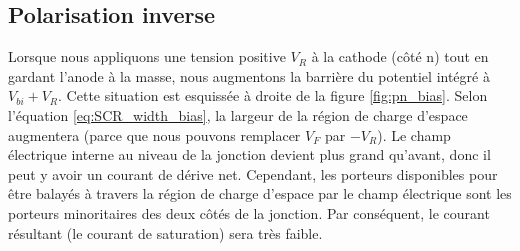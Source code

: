 \subsection{Polarisation inverse}
Lorsque nous appliquons une tension positive $V_R$ à la cathode (côté n) tout en gardant l'anode à la masse, nous augmentons la barrière du potentiel intégré à $V_{bi}+V_R$. Cette situation est esquissée à droite de la figure \ref{fig:pn_bias}. Selon l'équation \ref{eq:SCR_width_bias}, la largeur de la région de charge d'espace augmentera (parce que nous pouvons remplacer $V_F$ par $-V_R$). Le champ électrique interne au niveau de la jonction devient plus grand qu'avant, donc il peut y avoir un courant de dérive net. Cependant, les porteurs disponibles pour être balayés à travers la région de charge d'espace par le champ électrique sont les porteurs minoritaires des deux côtés de la jonction. Par conséquent, le courant résultant (le courant de saturation) sera très faible.

